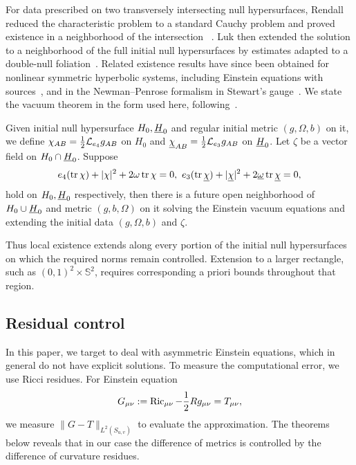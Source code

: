 For data prescribed on two transversely intersecting null hypersurfaces,
Rendall reduced the characteristic problem to a standard Cauchy problem and
proved existence in a neighborhood of the intersection
~\cite{rendall-90}.  Luk then extended the solution to a neighborhood of the
full initial null hypersurfaces by estimates adapted to a double-null
foliation~\cite{luk-12}.  Related existence results have since been obtained
for nonlinear symmetric hyperbolic systems, including Einstein equations with
sources~\cite{cabet-16}, and in the Newman--Penrose formalism in Stewart's
gauge~\cite{hilditch-20}.  We state the vacuum theorem in the form used here,
following~\cite{luk-12}.
\begin{theorem}
    Given initial null hypersurface $H_0,\underline H_0$ and regular initial metric $(g,\Omega,b)$ on it, we define $\chi_{AB}=\frac{1}{2}\mathcal L_{e_4}g_{AB}$ on $H_0$ and $\underline\chi_{AB}=\frac{1}{2}\mathcal L_{e_3}g_{AB}$ on $\underline H_0$. Let $\zeta$ be a vector field on $H_{0}\cap \underline H_0$. Suppose 
    \[e_4(\tr\chi)+|\chi|^2+2\omega\tr\chi=0,\ e_3(\tr\chib)+|\chib|^2+2\omegab\tr\chib=0,\]
    hold on $H_0,\underline H_0$ respectively, then there is a future open neighborhood of $H_0\cup \underline H_0$ and metric $(g,b,\Omega)$ on it solving the Einstein vacuum equations and extending the initial data $(g,\Omega,b)$ and $\zeta$. 
\end{theorem}
Thus local existence extends along every portion of the initial null
hypersurfaces on which the required norms remain controlled.  Extension to a
larger rectangle, such as $(0,1)^2\times\mathbb{S}^2$, requires corresponding
a priori bounds throughout that region.

\subsection{Residual control}
In this paper, we target to deal with asymmetric Einstein equations, which in general do not have explicit solutions. To measure the computational error, we use Ricci residues. For Einstein equation 
\[G_{\mu\nu}:=\operatorname{Ric}_{\mu\nu}-\frac{1}{2}Rg_{\mu\nu}=T_{\mu\nu},\]
we measure $\|G-T\|_{L^2(S_{u,v})}$ to evaluate the approximation. The theorems below reveals that in our case the difference of metrics is controlled by the difference of curvature residues.



